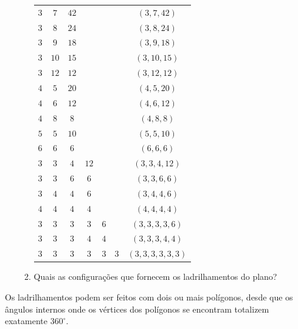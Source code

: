\begin{enumerate}
\begin{enumerate}
		\begin{tabu} to \textwidth{|c|c|c|c|c|c|c|}
		\hline
		 &  &  & &  &  &  \\
		\hline
		$3$ & $7$ & $42$ & & & & $(3,7,42)$ \\
		\hline
		$3$ & $8$ & $24$ & & & & $(3,8,24)$ \\
		\hline
		$3$ & $9$ & $18$ & & & & $(3,9,18)$ \\
		\hline
		$3$ & $10$ & $15$ & & & & $(3,10,15)$ \\
		\hline
		$3$ & $12$ & $12$ & & & & $(3,12,12)$ \\
		\hline
		$4$ & $5$ & $20$ & & & & $(4,5,20)$ \\
		\hline
		$4$ & $6$ & $12$ & & & & $(4,6,12)$ \\
		\hline
		$4$ & $8$ & $8$ & & & & $(4,8,8)$ \\
		\hline
		$5$ & $5$ & $10$ & & & & $(5,5,10)$ \\
		\hline
		$6$ & $6$ & $6$ & & & & $(6,6,6)$ \\
		\hline
		$3$ & $3$ & $4$ & $12$ & & & $(3,3,4,12)$ \\
		\hline
		$3$ & $3$ & $6$ & $6$ & & & $(3,3,6,6)$ \\
		\hline
		$3$ & $4$ & $4$ & $6$ & & & $(3,4,4,6)$ \\
		\hline
		$4$ & $4$ & $4$ & $4$ & & & $(4,4,4,4)$ \\
		\hline
		$3$ & $3$ & $3$ & $3$ & $6$ & & $(3,3,3,3,6)$ \\
		\hline
		$3$ & $3$ & $3$ & $4$ & $4$ & & $(3,3,3,4,4)$ \\
		\hline
		$3$ & $3$ & $3$ & $3$ & $3$ & $3$ & $(3,3,3,3,3,3)$ \\
		\hline
		\end{tabu}

	\item Quais as configurações que fornecem os ladrilhamentos do plano?
\end{enumerate}
\end{enumerate}

Os ladrilhamentos podem ser feitos com dois ou mais polígonos, desde que os ângulos internos onde os vértices dos polígonos se encontram totalizem exatamente $360^{\circ}$.



